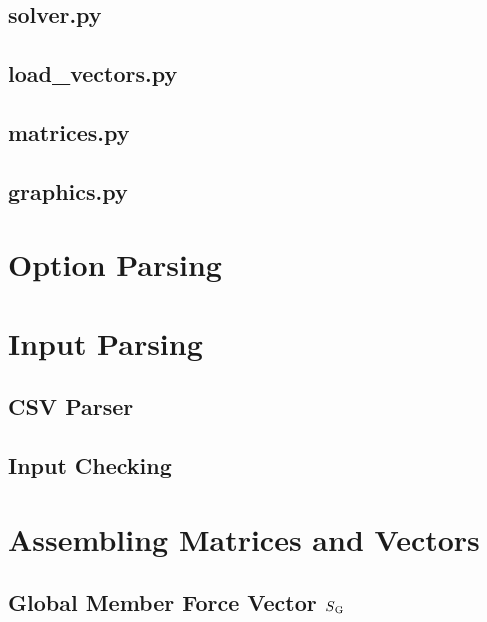\subsection{solver.py}
\label{subsec:solver.py}


\subsection{load\_vectors.py}
\label{subsec:loadvectors.py}


\subsection{matrices.py}
\label{subsec:matrices.py}


\subsection{graphics.py}
\label{subsec:graphics.py}


\pagebreak

\section{Option Parsing}
\label{sec:optparse}


\section{Input Parsing}
\label{sec:inputpars}

\subsection{CSV Parser}
\label{sec:csvparse}

\subsection{Input Checking}
\label{sec:inputcheck}


\section{Assembling Matrices and Vectors}
\label{sec:asmmatrvec}

\subsection{Global Member Force Vector $S\textsubscript{G}$}
\label{sec:asmSG}


